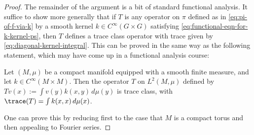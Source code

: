\documentclass[reqno]{amsart} 
\begin{document}
\begin{proof}
  The remainder of the argument is a bit of standard functional analysis.  It suffice to show more generally that if $T$ is any operator on $\pi$ defined as in \eqref{eq:pi-of-f-via-k} by a smooth kernel $k \in C^\infty(G \times G)$ satisfying \eqref{eq:functional-eqn-for-k-kernel-ps}, then $T$ defines a trace class operator with trace given by \eqref{eq:diagonal-kernel-integral}.  This can be proved in the same way as the following statement, which may have come up in a functional analysis course:
  \begin{center}
    Let $(M,\mu)$ be a compact manifold equipped with a smooth finite measure, and let $k \in C^\infty(M \times M)$.  Then the operator $T$ on $L^2(M,\mu)$ defined by $T v(x) := \int v(y) k(x,y) \, d \mu(y)$ is trace class, with $\trace(T) = \int k(x,x) \, d \mu(x)$.
  \end{center}
  One can prove this by reducing first to the case that $M$ is a compact torus and then appealing to Fourier series.

\end{proof}
\end{document}
